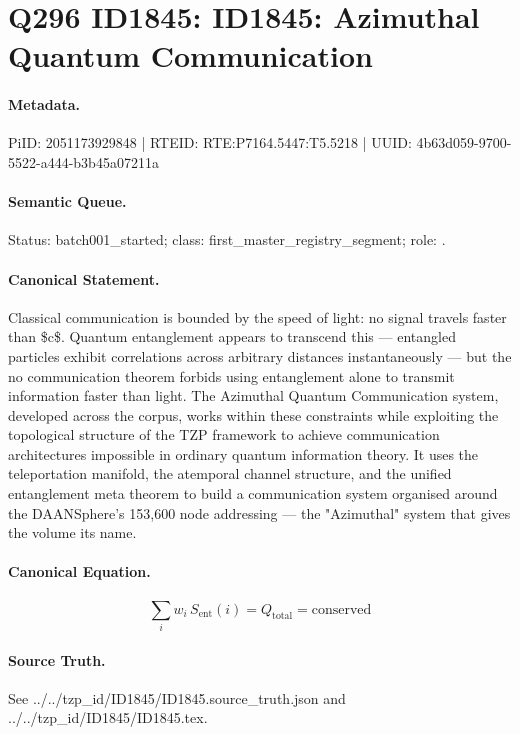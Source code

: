 \section*{Q296 ID1845: ID1845: Azimuthal Quantum Communication}
\paragraph{Metadata.}
PiID: 2051173929848 | RTEID: RTE:P7164.5447:T5.5218 | UUID: 4b63d059-9700-5522-a444-b3b45a07211a

\paragraph{Semantic Queue.}
Status: batch001\_started; class: first\_master\_registry\_segment; role: .

\paragraph{Canonical Statement.}
Classical communication is bounded by the speed of light: no signal travels faster than \$c\$. Quantum entanglement appears to transcend this — entangled particles exhibit correlations across arbitrary distances instantaneously — but the no communication theorem forbids using entanglement alone to transmit information faster than light. The Azimuthal Quantum Communication system, developed across the corpus, works within these constraints while exploiting the topological structure of the TZP framework to achieve communication architectures impossible in ordinary quantum information theory. It uses the teleportation manifold, the atemporal channel structure, and the unified entanglement meta theorem to build a communication system organised around the DAANSphere's 153,600 node addressing — the "Azimuthal" system that gives the volume its name.

\paragraph{Canonical Equation.}
\[
\sum_i w_i\, S_\text{ent}(i) = Q_\text{total} = \text{conserved}
\]

\paragraph{Source Truth.}
See ../../tzp\_id/ID1845/ID1845.source\_truth.json and ../../tzp\_id/ID1845/ID1845.tex.
